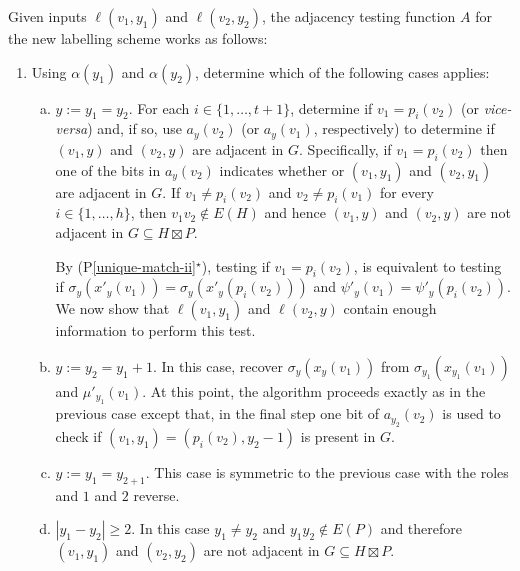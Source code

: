 \documentclass{patmorin}
\newcommand{\psref}[1]{(P\ref{#1}$^{\star}$)}
\begin{document}
Given inputs $\ell(v_1,y_1)$ and $\ell(v_2,y_2)$, the adjacency testing function $A$ for the new labelling scheme works as follows:
\begin{enumerate}
    \item Using $\alpha(y_1)$ and $\alpha(y_2)$, determine which of the following cases applies:
    \begin{enumerate}[(a)]
        \item $y:=y_1=y_2$.  For each $i\in\{1,\ldots,t+1\}$, determine if $v_1=p_i(v_2)$ (or \textit{vice-versa}) and, if so, use $a_y(v_2)$ (or $a_y(v_1)$, respectively) to determine if $(v_1,y)$ and $(v_2,y)$ are adjacent in $G$. Specifically, if $v_1=p_i(v_2)$ then one of the bits in $a_y(v_2)$ indicates whether or $(v_1,y_1)$ and $(v_2,y_1)$ are adjacent in $G$. If $v_1\neq p_i(v_2)$ and $v_2\neq p_i(v_1)$ for every $i\in\{1,\ldots,h\}$, then $v_1v_2\not\in E(H)$ and hence $(v_1,y)$ and $(v_2,y)$ are not adjacent in $G\subseteq H\boxtimes P$.

        By \psref{unique-match-ii}, testing if $v_1=p_i(v_2)$, is equivalent to testing if $\sigma_y(x'_y(v_1))=\sigma_y(x'_y(p_i(v_2)))$ and $\psi'_y(v_1)=\psi'_y(p_i(v_2))$. We now show that $\ell(v_1,y_1)$ and $\ell(v_2,y)$ contain enough information to perform this test.

        \item $y:=y_2=y_1+1$.  In this case, recover $\sigma_y(x_y(v_1))$ from $\sigma_{y_1}(x_{y_1}(v_1))$ and $\mu'_{y_1}(v_1)$.  At this point, the algorithm proceeds exactly as in the previous case except that, in the final step one bit of $a_{y_2}(v_2)$ is used to check if $(v_1,y_1)=(p_i(v_2),y_2-1)$ is present in $G$.

        \item $y:=y_1=y_{2+1}$. This case is symmetric to the previous case with the roles and $1$ and $2$ reverse.

        \item $|y_1-y_2|\ge 2$.  In this case $y_1\neq y_2$ and $y_1y_2\not\in E(P)$ and therefore $(v_1,y_1)$ and $(v_2,y_2)$ are not adjacent in $G\subseteq H\boxtimes P$.
    \end{enumerate}
\end{enumerate}
\end{document}
